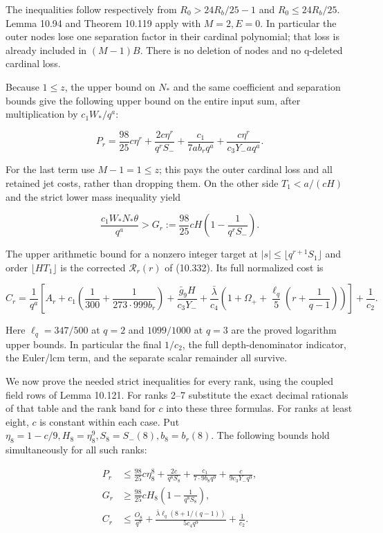 \documentclass[
  11pt,
  a4paper,
]{article}
\begin{document}
The inequalities follow respectively from \(R_0>24R_b/25-1\) and
\(R_0\le24R_b/25\). Lemma 10.94 and Theorem 10.119 apply with
\(M=2,E=0\). In particular the outer nodes lose one separation factor in
their cardinal polynomial; that loss is already included in \((M-1)B\).
There is no deletion of nodes and no q-deleted cardinal loss.

Because \(1\le z\), the upper bound on \(N_*\) and the same coefficient
and separation bounds give the following upper bound on the entire input
sum, after multiplication by \(c_1W_*/q^a\):

\[
P_r=\frac{98}{25}c\eta^r
 +\frac{2c\eta^r}{q^rS_-}
 +\frac{c_1}{7ab_rq^a}
 +\frac{c\eta^r}{c_3Y_-aq^a}.
\tag{10.407}
\]

For the last term use \(M-1=1\le z\); this pays the outer cardinal loss
and all retained jet costs, rather than dropping them. On the other side
\(T_1<a/(cH)\) and the strict lower mass inequality yield

\[
\frac{c_1W_*N_*\theta}{q^a}>
G_r:=\frac{98}{25}cH\left(1-\frac1{q^rS_-}\right).
\tag{10.408}
\]

The upper arithmetic bound for a nonzero integer target at
\(|s|\le\lfloor q^{r+1}S_1\rfloor\) and order \(\lfloor HT_1\rfloor\) is
the corrected \(\mathcal R_r(r)\) of (10.332). Its full normalized cost
is

\[
C_r=\frac1{q^a}\left[
A_r+c_1\left(\frac1{300}+\frac1{273\cdot999b_r}\right)
 +\frac{\bar g_9H}{c_3Y_-}
 +\frac{\bar\lambda}{c_4}
 \left(1+\Omega_++\frac{\ell_q}{5}
 \left(r+\frac1{q-1}\right)\right)\right]+\frac1{c_2}.
\tag{10.409}
\]

Here \(\ell_q=347/500\) at \(q=2\) and \(1099/1000\) at \(q=3\) are the
proved logarithm upper bounds. In particular the final \(1/c_2\), the
full depth-denominator indicator, the Euler/lcm term, and the separate
scalar remainder all survive.

We now prove the needed strict inequalities for every rank, using the
coupled field rows of Lemma 10.121. For ranks 2--7 substitute the exact
decimal rationals of that table and the rank band for \(c\) into these
three formulas. For ranks at least eight, \(c\) is constant within each
case. Put \(\eta_8=1-c/9,H_8=\eta_8^9,S_8=S_-(8),b_8=b_r(8)\). The
following bounds hold simultaneously for all such ranks:

\[
\begin{aligned}
P_r&\le\frac{98}{25}c\eta_8^8
 +\frac{2c}{q^8S_8}
 +\frac{c_1}{7\cdot9b_8q^9}
 +\frac{c}{9c_3Y_-q^9},\\
G_r&\ge\frac{98}{25}cH_8
 \left(1-\frac1{q^8S_8}\right),\\
C_r&\le\frac{O_8}{q^9}
 +\frac{\bar\lambda\ell_q(8+1/(q-1))}{5c_4q^9}
 +\frac1{c_2}.
\end{aligned}
\tag{10.410}
\]
\end{document}
